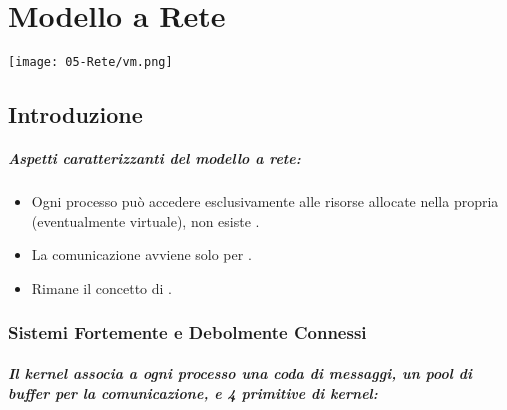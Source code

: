 \chapter{Modello a Rete}

\begin{center}
	\texttt{[image: 05-Rete/vm.png]}
\end{center}
\section{Introduzione}

\paragraph{Aspetti caratterizzanti del modello a rete:}

\begin{itemize}
	\item Ogni processo può accedere esclusivamente alle risorse allocate nella propria  (eventualmente virtuale), non esiste .
	\item La comunicazione avviene solo per .
	\item Rimane il concetto di .
\end{itemize}

\subsection{Sistemi Fortemente e Debolmente Connessi}



\paragraph{Il kernel associa a ogni processo una coda di messaggi, un pool di buffer per la comunicazione, e 4 primitive di kernel:}

